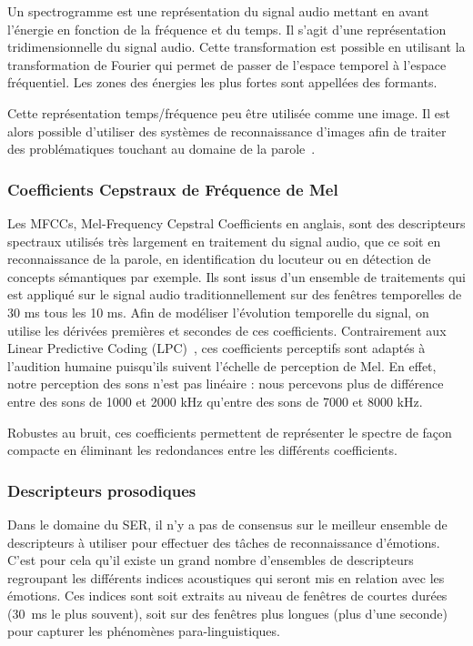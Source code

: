 Un spectrogramme est une représentation du signal audio mettant en avant l'énergie en fonction de la fréquence et du temps. %
Il s'agit d'une représentation tridimensionnelle du signal audio. Cette transformation est possible en utilisant la transformation de Fourier qui permet de passer de l'espace temporel à l'espace fréquentiel. Les zones des énergies les plus fortes sont appellées des formants.

Cette représentation temps/fréquence peu être utilisée comme une image. Il est alors possible d'utiliser des systèmes de reconnaissance d'images afin de traiter des problématiques touchant au domaine de la parole~\cite{Stolar2017}.


\subsubsection{Coefficients Cepstraux de Fréquence de Mel}
Les MFCCs, Mel-Frequency Cepstral Coefficients en anglais, sont des descripteurs spectraux utilisés très largement en traitement du signal audio, que ce soit en reconnaissance de la parole, en identification du locuteur ou en détection de concepts sémantiques par exemple. Ils sont issus d'un ensemble de traitements qui est appliqué sur le signal audio traditionnellement sur des fenêtres temporelles de 30 ms tous les 10 ms. Afin de modéliser l'évolution temporelle du signal, on utilise les dérivées premières et secondes de ces coefficients. Contrairement aux Linear Predictive Coding (LPC)~\cite{Rabiner1993},
ces coefficients perceptifs sont adaptés à l'audition humaine puisqu'ils suivent l'échelle de perception de Mel. En effet, notre perception des sons n'est pas linéaire : nous percevons plus de différence entre des sons de 1000 et 2000 kHz qu'entre des sons de 7000 et 8000 kHz.

Robustes au bruit, ces coefficients permettent de représenter le spectre de façon compacte en éliminant les redondances entre les différents coefficients.


\subsubsection{Descripteurs prosodiques}
Dans le domaine du SER, il n'y a pas de consensus sur le meilleur ensemble de descripteurs à utiliser pour effectuer des tâches de reconnaissance d'émotions. C'est pour cela qu'il existe un grand nombre d'ensembles de descripteurs regroupant les différents indices acoustiques qui seront mis en relation avec les émotions. Ces indices sont soit extraits au niveau de fenêtres de courtes durées (30~ms le plus souvent), soit sur des fenêtres plus longues (plus d'une seconde) pour capturer les phénomènes para-linguistiques.


